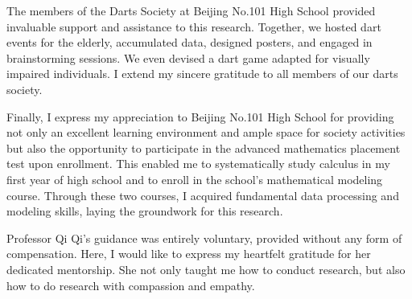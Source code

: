 \documentclass[cjjs]{ipart}
\theoremstyle{plain}
\begin{document}
The members of the Darts Society at Beijing No.101 High School provided invaluable support and assistance to this research. Together, we hosted dart events for the elderly, accumulated data, designed posters, and engaged in brainstorming sessions. We even devised a dart game adapted for visually impaired individuals. I extend my sincere gratitude to all members of our darts society.

Finally, I express my appreciation to Beijing No.101 High School for providing not only an excellent learning environment and ample space for society activities but also the opportunity to participate in the advanced mathematics placement test upon enrollment. This enabled me to systematically study calculus in my first year of high school and to enroll in the school's mathematical modeling course. Through these two courses, I acquired fundamental data processing and modeling skills, laying the groundwork for this research.

Professor Qi Qi's guidance was entirely voluntary, provided without any form of compensation. Here, I would like to express my heartfelt gratitude for her dedicated mentorship. She not only taught me how to conduct research, but also how to do research with compassion and empathy. 
\end{document}
